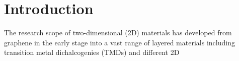 \documentclass[%
superscriptaddress,
preprint,
showpacs,preprintnumbers,
 amsmath,amssymb,
prb,
]{revtex4-1}
\begin{document}
\maketitle

\section{Introduction}

The research scope of two-dimensional (2D) materials has developed from graphene \cite{butler2013progress} in the early stage into a vast range of layered materials
including transition metal dichalcogenies (TMDs) and different 2D
\end{document}
